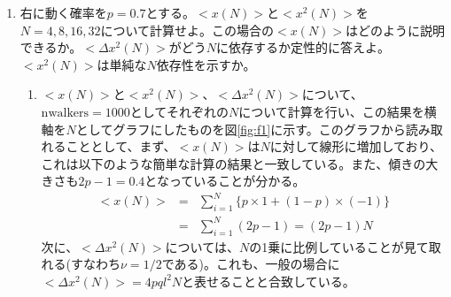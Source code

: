 \documentclass{jsarticle}
\begin{document}
        \begin{enumerate}
            \renewcommand{\labelenumi}{\alph{enumi}.}
            \renewcommand{\labelenumii}{}
            
            \item 右に動く確率を$p=0.7$とする。$< x(N)> $と$< x^{2}(N)> $を$N=4,8,16,32$について計算せよ。この場合の$< x(N)> $はどのように説明できるか。$< \Delta x^{2}(N)> $がどう$N$に依存するか定性的に答えよ。$< x^{2}(N)> $は単純な$N$依存性を示すか。
                
                \begin{enumerate}
                    \item $< x(N)> $と$< x^{2}(N)> $、$< \Delta x^{2}(N)> $について、$\mathrm{nwalkers}=1000$としてそれぞれの$N$について計算を行い、この結果を横軸を$N$としてグラフにしたものを図\ref{fig:f1}に示す。このグラフから読み取れることとして、まず、$< x(N)> $は$N$に対して線形に増加しており、これは以下のような簡単な計算の結果と一致している。また、傾きの大きさも$2p-1=0.4$となっていることが分かる。
                    \begin{eqnarray}
                        <x(N)>  &=& \sum_{i=1}^{N}\{ p\times 1 + (1-p)\times (-1)\} \\
                        &=& \sum_{i=1}^{N}(2p-1) = (2p-1)N
                    \end{eqnarray}
                    次に、$< \Delta x^{2}(N)> $については、$N$の1乗に比例していることが見て取れる(すなわち$\nu = 1/2$である)。これも、一般の場合に$< \Delta x^{2}(N)> =4pql^{2}N$と表せることと合致している。
                    

\end{enumerate}
\end{enumerate}
\end{document}
